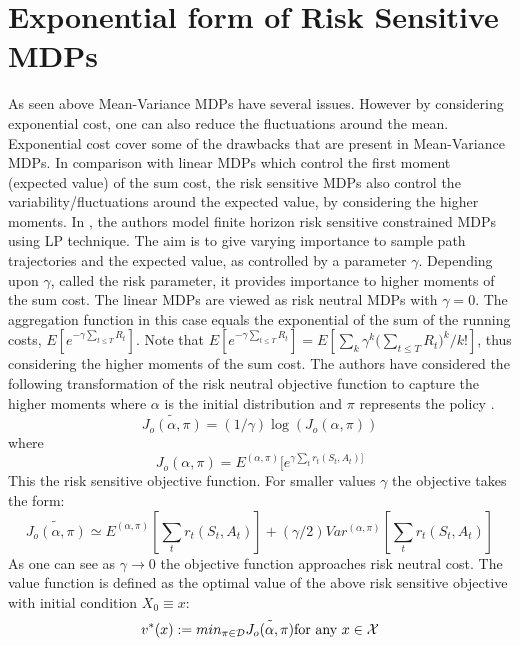 \documentclass[11pt,a4paper,oneside]{report}
\begin{document}
\section{Exponential form of Risk Sensitive MDPs}
As seen above Mean-Variance MDPs have several issues. However by considering exponential cost, one can also reduce the fluctuations around the mean. Exponential cost cover some of the drawbacks that are present in Mean-Variance MDPs.
In comparison with linear MDPs which control the first moment (expected value) of the sum cost, the risk sensitive MDPs also control the variability/fluctuations around the expected value, by considering the higher moments. In \cite{kumar2015finite}, the authors model finite horizon risk sensitive constrained MDPs using LP technique.  The aim is to give varying importance to sample path trajectories and the expected value, as controlled by a parameter $\gamma$. Depending upon $\gamma$, called the risk parameter, it provides importance to higher moments of the sum cost. The linear MDPs are viewed as risk neutral MDPs with $\gamma=0$. The aggregation function in this case equals the exponential of the sum of the running costs, $E[e^{-\gamma {\sum_{t\leq T}R_t}} ]$. Note that $E[e^{-\gamma {\sum_{t\leq T}R_t}} ]= E[{\sum_k \gamma ^k {(\sum_{t\leq T}{R_t}})^{k}}/{k!}]$, thus considering the higher moments of the sum cost.
The authors have considered the following transformation of the risk neutral objective function to capture the higher moments where $\alpha$ is the initial distribution and $\pi$ represents the policy .
\begin{equation}
\tilde{J_o(\alpha,\pi)} = (1/\gamma)\log(J_o(\alpha,\pi))
\end{equation} 
where
\begin{equation}
J_o(\alpha,\pi) = E^{(\alpha,\pi)}[e^{\gamma \sum_t r_t(S_t,A_t)]} 
\end{equation}
This the risk sensitive objective function. For smaller values $\gamma$ the objective takes the form:
\begin{equation}
\tilde{J_o(\alpha,\pi)} \simeq E^{(\alpha,\pi)}[ \sum_t r_t(S_t,A_t)] + (\gamma /2)Var^{(\alpha,\pi)}[\sum_t r_t(S_t,A_t)] 
\end{equation} 
As one can see as $\gamma \rightarrow 0$ the objective function approaches risk neutral cost. The value function is defined as the optimal value of the above risk sensitive objective with initial condition $X_0\equiv x$:
\begin{equation}
v^*(x):=min_{\pi\in\cal{D}}\tilde{J_o(\alpha,\pi)}  \text{for any } x\in \cal{X}
\end{equation}
\end{document}
